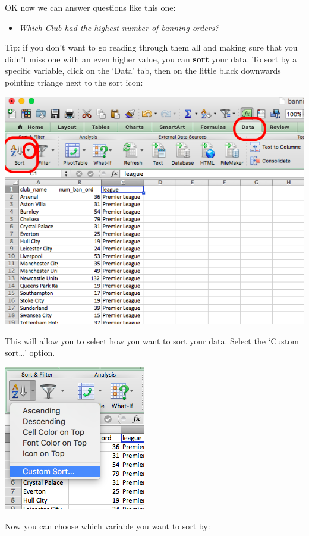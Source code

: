 \documentclass[]{book}
\providecommand{\tightlist}{%
  \setlength{\itemsep}{0pt}\setlength{\parskip}{0pt}}
\theoremstyle{definition}
\theoremstyle{definition}
\theoremstyle{definition}
\theoremstyle{remark}
\begin{document}
OK now we can answer questions like this one:

\begin{itemize}
\tightlist
\item
  \emph{Which Club had the highest number of banning orders?}
\end{itemize}

Tip: if you don't want to go reading through them all and making sure
that you didn't miss one with an even higher value, you can
\textbf{sort} your data. To sort by a specific variable, click on the
`Data' tab, then on the little black downwards pointing triange next to
the sort icon:

\includegraphics{imgs/sort_icon.png}

This will allow you to select how you want to sort your data. Select the
`Custom sort\ldots{}' option.

\includegraphics{imgs/custom_sort.png}

Now you can choose which variable you want to sort by:
\end{document}
